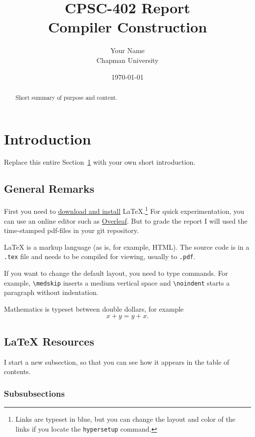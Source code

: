 \documentclass{article}
\title{CPSC-402 Report\\Compiler Construction}
\author{Your Name  \\ Chapman University}
\date{\today}
\theoremstyle{theorem}
\theoremstyle{definition}
\theoremstyle{remark}
\begin{document}
\maketitle

\begin{abstract}
Short  summary of purpose and content.  
\end{abstract}

\tableofcontents

\section{Introduction}\label{intro}

Replace this entire Section~\ref{intro} with your own short introduction. 

\subsection{General Remarks}

First you need to \href{https://www.latex-project.org/get/}{download and install} LaTeX.\footnote{Links are typeset in blue, but you can change the layout and color of the links if you locate the  \texttt{hypersetup} command.}
%
For quick experimentation, you can use an online editor such as \href{https://www.overleaf.com/learn}{Overleaf}. But to grade the report I will used the time-stamped pdf-files in your git repository.  

 
\medskip\noindent
LaTeX is a markup language (as is, for example, HTML). The source code is in a \verb+.tex+ file and needs to be compiled for viewing, usually to \verb+.pdf+.


\medskip\noindent
If you want to change the default layout, you need to type commands. For example, \verb+\medskip+ inserts a medium vertical space and \verb+\noindent+ starts a paragraph without indentation.
 
\medskip\noindent
Mathematics is typeset between double dollars, for example $$x+y=y+x.$$


\subsection{LaTeX Resources}

I start a new subsection, so that you can see how it appears in the table of contents.

\subsubsection{Subsubsections}
\end{document}
